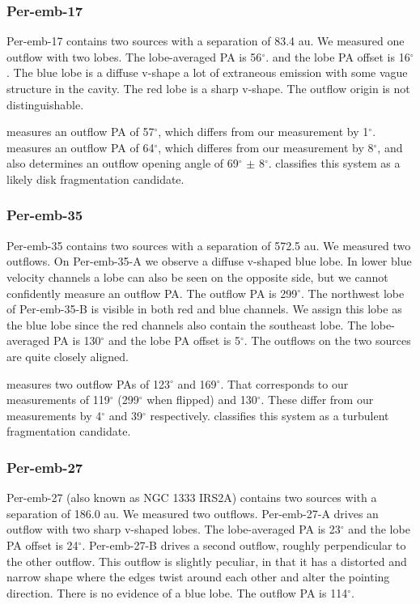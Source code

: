 \documentclass[linenumbers,twocolumn, twocolappendix]{aastex631}
\begin{document}
\subsubsection{Per-emb-17}
Per-emb-17 contains two sources with a separation of 83.4 au. We measured one outflow with two lobes. The lobe-averaged PA is 56$^\circ$. and the lobe PA offset is 16$^\circ$. The blue lobe is a diffuse v-shape a lot of extraneous emission with some vague structure in the cavity. The red lobe is a sharp v-shape. The outflow origin is not distinguishable.

\cite{Stephens_et_al_2017} measures an outflow PA of 57$^\circ$, which differs from our measurement by 1$^\circ$. \cite{Dunham_et_al_2024} measures an outflow PA of 64$^\circ$, which differes from our measurement by 8$^\circ$, and also determines an outflow opening angle of 69$^\circ$ $\pm$ 8$^\circ$. \cite{Reynolds_et_al_2024} classifies this system as a likely disk fragmentation candidate.

\subsubsection{Per-emb-35}
Per-emb-35 contains two sources with a separation of 572.5 au. We measured two outflows. On Per-emb-35-A we observe a diffuse v-shaped blue lobe. In lower blue velocity channels a lobe can also be seen on the opposite side, but we cannot confidently measure an outflow PA. The outflow PA is 299$^\circ$. The northwest lobe of Per-emb-35-B is visible in both red and blue channels. We assign this lobe as the blue lobe since the red channels also contain the southeast lobe. The lobe-averaged PA is 130$^\circ$ and the lobe PA offset is 5$^\circ$. The outflows on the two sources are quite closely aligned.

\cite{Stephens_et_al_2017} measures two outflow PAs of 123$^\circ$ and 169$^\circ$. That corresponds to our measurements of 119$^\circ$ (299$^\circ$ when flipped) and 130$^\circ$. These differ from our measurements by 4$^\circ$ and 39$^\circ$ respectively. \cite{Reynolds_et_al_2024} classifies this system as a turbulent fragmentation candidate.

\subsubsection{Per-emb-27}
Per-emb-27 (also known as NGC 1333 IRS2A) contains two sources with a separation of 186.0 au. We measured two outflows. Per-emb-27-A drives an outflow with two sharp v-shaped lobes. The lobe-averaged PA is 23$^\circ$ and the lobe PA offset is 24$^\circ$. Per-emb-27-B drives a second outflow, roughly perpendicular to the other outflow. This outflow is slightly peculiar, in that it has a distorted and narrow shape where the edges twist around each other and alter the pointing direction. There is no evidence of a blue lobe. The outflow PA is 114$^\circ$.
\end{document}
